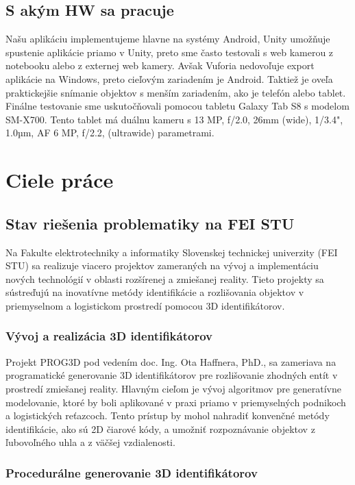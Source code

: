 \subsection{S akým HW sa pracuje}

Našu aplikáciu implementujeme hlavne na systémy Android, Unity umožňuje spustenie aplikácie priamo v Unity, preto sme často testovali s web kamerou z notebooku alebo z externej web kamery. Avšak Vuforia nedovoľuje export aplikácie na Windows, preto cieľovým zariadením je Android. Taktiež je oveľa praktickejšie snímanie objektov s menším zariadením, ako je telefón alebo tablet. Finálne testovanie sme uskutočňovali pomocou tabletu Galaxy Tab S8 s modelom SM-X700. Tento tablet má duálnu kameru s 13 MP, f/2.0, 26mm (wide), 1/3.4", 1.0µm, AF
6 MP, f/2.2, (ultrawide) parametrami.

\section{Ciele práce}

\subsection{Stav riešenia problematiky na FEI STU}

Na Fakulte elektrotechniky a informatiky Slovenskej technickej univerzity (FEI STU) sa realizuje viacero projektov zameraných na vývoj a implementáciu nových technológií v oblasti rozšírenej a zmiešanej reality. Tieto projekty sa sústreďujú na inovatívne metódy identifikácie a rozlišovania objektov v priemyselnom a logistickom prostredí pomocou 3D identifikátorov.

\subsubsection{Vývoj a realizácia 3D identifikátorov}

Projekt PROG3D pod vedením doc. Ing. Ota Haffnera, PhD., sa zameriava na programatické generovanie 3D identifikátorov pre rozlišovanie zhodných entít v prostredí zmiešanej reality. Hlavným cieľom je vývoj algoritmov pre generatívne modelovanie, ktoré by boli aplikované v praxi priamo v priemyselných podnikoch a logistických reťazcoch. Tento prístup by mohol nahradiť konvenčné metódy identifikácie, ako sú 2D čiarové kódy, a umožniť rozpoznávanie objektov z ľubovoľného uhla a z väčšej vzdialenosti.

\subsubsection{Procedurálne generovanie 3D identifikátorov}

